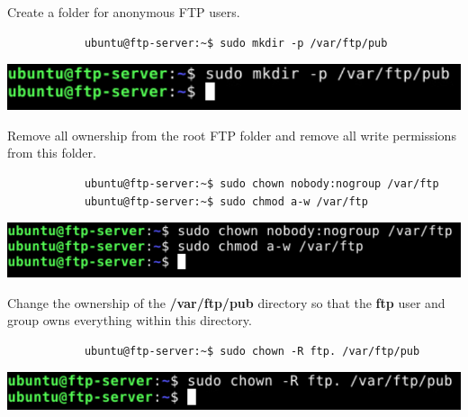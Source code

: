 \documentclass[letterpaper, 12pt]{article}
\begin{document}
\begin{enumerate}
    \begin{labstep}
        Create a folder for anonymous FTP users.
        \begin{lstlisting}
            ubuntu@ftp-server:~$ sudo mkdir -p /var/ftp/pub
        \end{lstlisting}

        \begin{center}
            \includegraphics[width=\linewidth]{images/part2/step11.png}
        \end{center}
    \end{labstep}

    \begin{labstep}
        Remove all ownership from the root FTP folder and remove all write permissions from this folder.
        \begin{lstlisting}
            ubuntu@ftp-server:~$ sudo chown nobody:nogroup /var/ftp
            ubuntu@ftp-server:~$ sudo chmod a-w /var/ftp
        \end{lstlisting}

        \begin{center}
            \includegraphics[width=\linewidth]{images/part2/step12.png}
        \end{center}
    \end{labstep}

    \begin{labstep}
        Change the ownership of the \textbf{/var/ftp/pub} directory so that the \textbf{ftp} user and group owns everything within this directory.
        \begin{lstlisting}
            ubuntu@ftp-server:~$ sudo chown -R ftp. /var/ftp/pub
        \end{lstlisting}

        \begin{center}
            \includegraphics[width=\linewidth]{images/part2/step13.png}
        \end{center}
    \end{labstep}


\end{enumerate}
\end{document}
